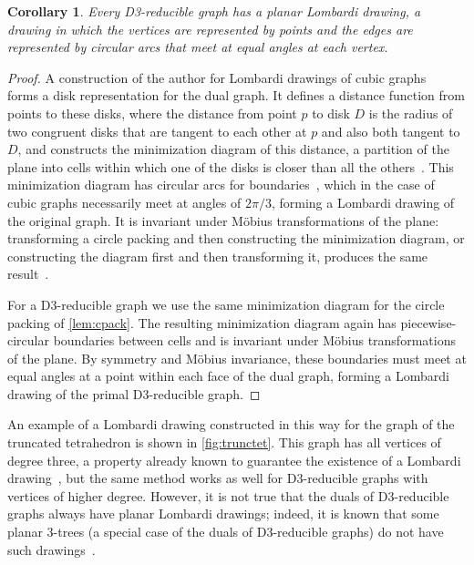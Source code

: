\documentclass{article}
\newtheorem{corollary}{Corollary}
\begin{document}
\begin{corollary}
Every D3-reducible graph has a planar \emph{Lombardi drawing}, a drawing in which the vertices are represented by points and the edges are represented by circular arcs that meet at equal angles at each vertex.
\end{corollary}

\begin{proof}
A construction of the author for Lombardi drawings of cubic graphs~\cite{Epp-DCG-14} forms a disk representation for the dual graph.
It defines a distance function from points to these disks, where the distance from point $p$ to disk $D$ is the radius of two congruent disks that are tangent to each other at $p$ and also both tangent to $D$, and constructs the minimization diagram of this distance, a partition of the plane into cells within which one of the disks is closer than all the others~\cite[Sec.~3]{Epp-DCG-14}. This minimization diagram has circular arcs for boundaries~\cite[Lem.~2]{Epp-DCG-14}, which in the case of cubic graphs necessarily meet at angles of $2\pi/3$, forming a Lombardi drawing of the original graph. It is invariant under M\"obius transformations of the plane: transforming a circle packing and then constructing the minimization diagram, or constructing the diagram first and then transforming it, produces the same result~\cite[Lem.~1]{Epp-DCG-14}.

For a D3-reducible graph we use the same minimization diagram for the circle packing of \autoref{lem:cpack}.
The resulting minimization diagram again has piecewise-circular boundaries between cells and is invariant under M\"obius transformations of the plane. By symmetry and M\"obius invariance, these boundaries must meet at equal angles at a point within each face of the dual graph, forming a Lombardi drawing of the primal D3-reducible graph.
\end{proof}

An example of a Lombardi drawing constructed in this way for the graph of the truncated tetrahedron is shown in \autoref{fig:trunctet}. This graph has all vertices of degree three, a property already known to guarantee the existence of a Lombardi drawing~\cite{Epp-DCG-14}, but the same method works as well for D3-reducible graphs with vertices of higher degree. However, it is not true that the duals of D3-reducible graphs always have planar Lombardi drawings; indeed, it is known that some planar 3-trees (a special case of the duals of D3-reducible graphs) do not have such drawings~\cite{DunEppGoo-GD-11}.
\end{document}
